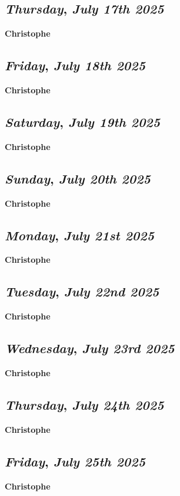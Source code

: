 \def\day{\textit{July 17th 2025}}
\def\weekday{\textit{Thursday}}
\subsection*{\weekday, \day}
\textbf {Christophe}

\def\day{\textit{July 18th 2025}}
\def\weekday{\textit{Friday}}
\subsection*{\weekday, \day}
\textbf {Christophe}

\def\day{\textit{July 19th 2025}}
\def\weekday{\textit{Saturday}}
\subsection*{\weekday, \day}
\textbf {Christophe}

\def\day{\textit{July 20th 2025}}
\def\weekday{\textit{Sunday}}
\subsection*{\weekday, \day}
\textbf {Christophe}

\def\day{\textit{July 21st 2025}}
\def\weekday{\textit{Monday}}
\subsection*{\weekday, \day}
\textbf {Christophe}

\def\day{\textit{July 22nd 2025}}
\def\weekday{\textit{Tuesday}}
\subsection*{\weekday, \day}
\textbf {Christophe}

\def\day{\textit{July 23rd 2025}}
\def\weekday{\textit{Wednesday}}
\subsection*{\weekday, \day}
\textbf {Christophe}

\def\day{\textit{July 24th 2025}}
\def\weekday{\textit{Thursday}}
\subsection*{\weekday, \day}
\textbf {Christophe}

\def\day{\textit{July 25th 2025}}
\def\weekday{\textit{Friday}}
\subsection*{\weekday, \day}
\textbf {Christophe}

